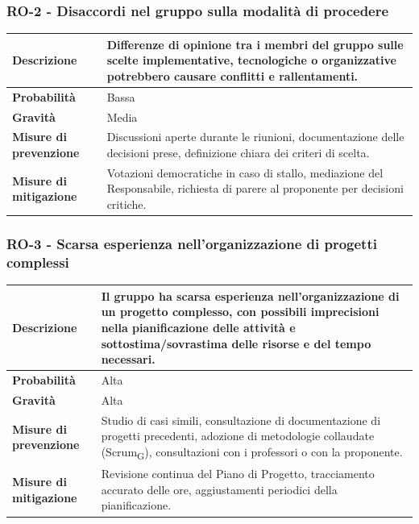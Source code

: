 \documentclass[11pt,a4paper]{article}
\newcommand{\gls}[1]{#1\textsubscript{G}}
\begin{document}
\subsubsection{RO-2 - Disaccordi nel gruppo sulla modalità di procedere}
\begin{center}
\begin{tabular}{|p{3cm}|p{12cm}|}
    \hline
    \textbf{Descrizione} & Differenze di opinione tra i membri del gruppo sulle scelte implementative, tecnologiche o organizzative potrebbero causare conflitti e rallentamenti. \\
    \hline
    \textbf{Probabilità} & Bassa \\
    \hline
    \textbf{Gravità} & Media \\
    \hline
    \textbf{Misure di prevenzione} & Discussioni aperte durante le riunioni, documentazione delle decisioni prese, definizione chiara dei criteri di scelta. \\
    \hline
    \textbf{Misure di mitigazione} & Votazioni democratiche in caso di stallo, mediazione del Responsabile, richiesta di parere al proponente per decisioni critiche. \\
    \hline
\end{tabular}
\end{center}

\subsubsection{RO-3 - Scarsa esperienza nell'organizzazione di progetti complessi}
\begin{center}
\begin{tabular}{|p{3cm}|p{12cm}|}
    \hline
    \textbf{Descrizione} & Il gruppo ha scarsa esperienza nell'organizzazione di un progetto complesso, con possibili imprecisioni nella pianificazione delle attività e sottostima/sovrastima delle risorse e del tempo necessari. \\
    \hline
    \textbf{Probabilità} & Alta \\
    \hline
    \textbf{Gravità} & Alta \\
    \hline
    \textbf{Misure di prevenzione} & Studio di casi simili, consultazione di documentazione di progetti precedenti, adozione di metodologie collaudate (\gls{Scrum}), consultazioni con i professori o con la proponente. \\
    \hline
    \textbf{Misure di mitigazione} & Revisione continua del Piano di Progetto, tracciamento accurato delle ore, aggiustamenti periodici della pianificazione. \\
    \hline
\end{tabular}
\end{center}
\end{document}
